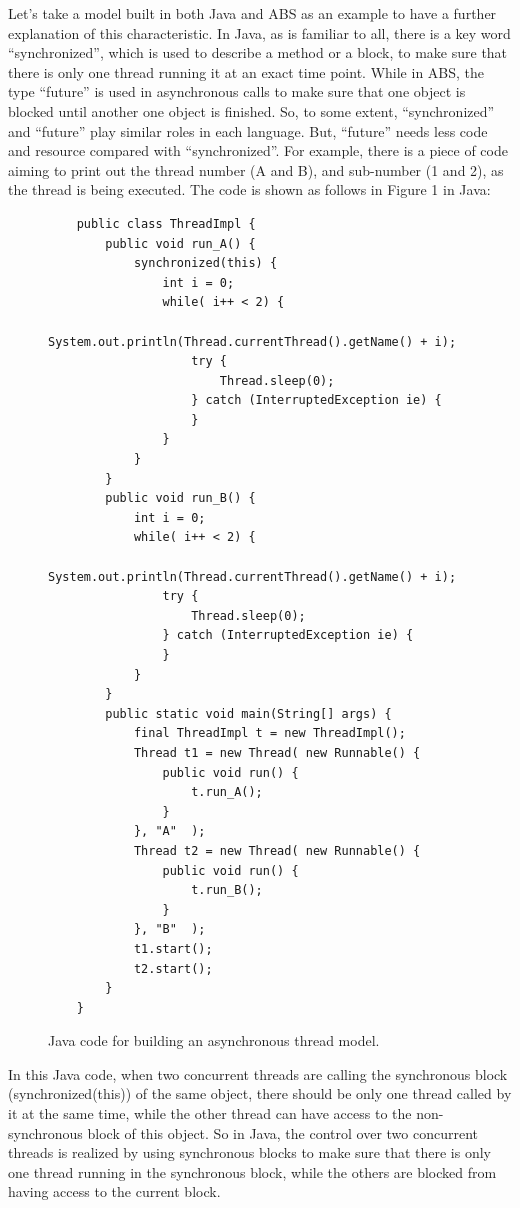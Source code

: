 \documentclass[article,dr=phil,type=msc,colorback,accentcolor=tud9c]{tudthesis}
\begin{document}
\begin{itemize}
  Let's take a model built in both Java and ABS as an example to have a further explanation of this characteristic. In Java, as is familiar to all, there is a key word ``synchronized'', which is used to describe a method or a block, to make sure that there is only one thread running it at an exact time point. While in ABS, the type ``future'' is used in asynchronous calls to make sure that one object is blocked until another one object is finished. So, to some extent, ``synchronized'' and ``future'' play similar roles in each language. But, ``future'' needs less code and resource compared with ``synchronized''. For example, there is a piece of code aiming to print out the thread number (A and B), and sub-number (1 and 2), as the thread is being executed. The code is shown as follows in Figure 1 in Java:
  
  \begin{figure}[H]
	\begin{lstlisting}
	public class ThreadImpl {  
		public void run_A() {  
			synchronized(this) {  
				int i = 0;  
				while( i++ < 2) {  
					System.out.println(Thread.currentThread().getName() + i);  
					try {  
						Thread.sleep(0);  
					} catch (InterruptedException ie) {  
					}  
				}  
			}  
		}  
		public void run_B() { 
			int i = 0;  
			while( i++ < 2) {  
				System.out.println(Thread.currentThread().getName() + i);  
				try {  
					Thread.sleep(0);  
				} catch (InterruptedException ie) {  
				} 
			}  
		}  
		public static void main(String[] args) {  
			final ThreadImpl t = new ThreadImpl();  
			Thread t1 = new Thread( new Runnable() {  
				public void run() { 
					t.run_A();  
				}  
			}, "A"  );  
			Thread t2 = new Thread( new Runnable() {  
				public void run() { 
					t.run_B();  
				}  
			}, "B"  );  
			t1.start();  
			t2.start();  
		} 
	}\end{lstlisting}
	\caption[Caption for LOF]{Java code for building an asynchronous thread model.}
  \end{figure}

  In this Java code, when two concurrent threads are calling the synchronous block (synchronized(this)) of the same object, there should be only one thread called by it at the same time, while the other thread can have access to the non-synchronous block of this object. So in Java, the control over two concurrent threads is realized by using synchronous blocks to make sure that there is only one thread running in the synchronous block, while the others are blocked from having access to the current block.


\end{itemize}
\end{document}
